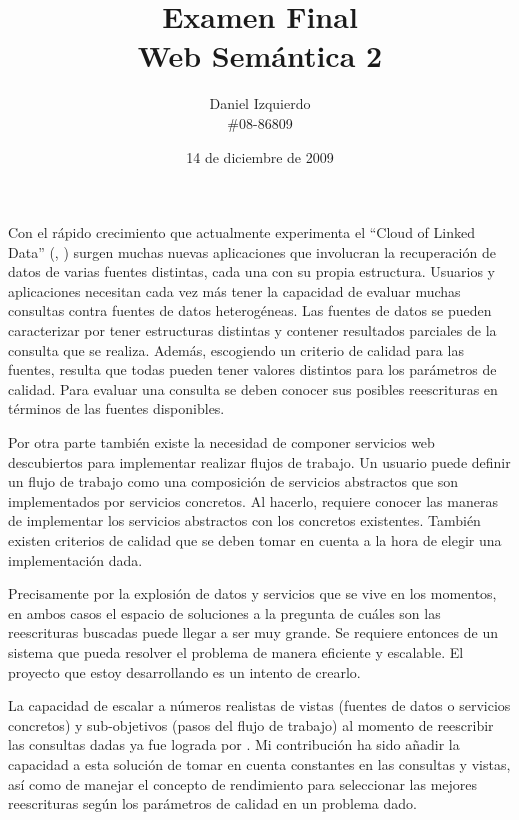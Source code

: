 \documentclass{article}
\begin{document}

\author{Daniel Izquierdo \\ \#08-86809}
\title{Examen Final \\ Web Semántica 2}
\date{14 de diciembre de 2009}
\maketitle


Con el rápido crecimiento que actualmente experimenta el ``Cloud of Linked
Data'' (\cite{Galperin09}, \cite{Benson07})
surgen muchas nuevas aplicaciones que involucran la recuperación de datos
de varias fuentes distintas, cada una con su propia estructura. Usuarios y
aplicaciones necesitan cada vez más tener la capacidad de evaluar muchas consultas
contra fuentes de datos heterogéneas. Las fuentes de datos se pueden
caracterizar por tener estructuras distintas y contener resultados parciales de
la consulta que se realiza. Además, escogiendo un criterio de calidad para las
fuentes, resulta que todas pueden tener valores distintos para los parámetros de
calidad. Para evaluar una consulta se deben conocer sus posibles reescrituras en
términos de las fuentes disponibles.

Por otra parte también existe la necesidad de componer servicios web
descubiertos para implementar realizar flujos de trabajo. Un usuario puede
definir un flujo de trabajo como una composición de servicios abstractos que son
implementados por servicios concretos. Al hacerlo, requiere conocer las maneras
de implementar los servicios abstractos con los concretos existentes. También
existen criterios de calidad que se deben tomar en cuenta a la hora de elegir
una implementación dada.

Precisamente por la explosión de datos y servicios que se vive en los momentos,
en ambos casos el espacio de soluciones a la pregunta de cuáles son las
reescrituras buscadas puede llegar a ser muy grande. Se requiere entonces de un
sistema que pueda resolver el problema de manera eficiente y escalable. El
proyecto que estoy desarrollando es un intento de crearlo.

La capacidad de escalar a números realistas de vistas (fuentes de datos o
servicios concretos) y sub-objetivos (pasos del flujo de trabajo) al momento de
reescribir las consultas dadas ya fue lograda por \cite{arvelo:aaai06}. Mi contribución
ha sido añadir la capacidad a esta solución de tomar en cuenta constantes en las
consultas y vistas, así como de manejar el concepto de rendimiento para
seleccionar las mejores reescrituras según los parámetros de calidad en un
problema dado.
\end{document}

